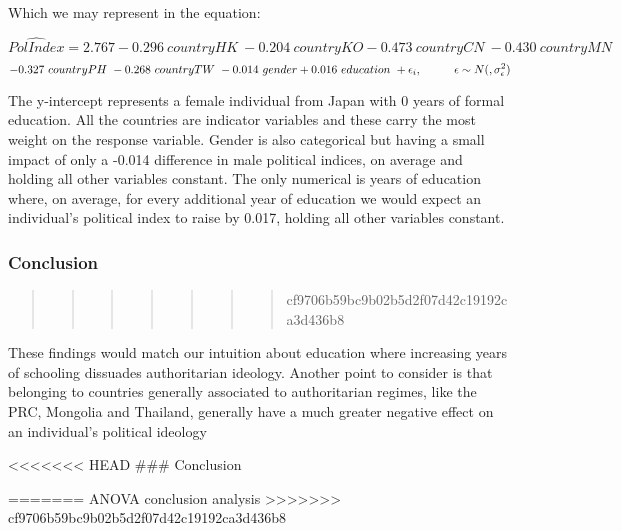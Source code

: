 \documentclass[
]{article}
\begin{document}
Which we may represent in the equation:

\[ \hat{PolIndex} = 2.767 - 0.296 ~ countryHK ~ - 0.204 ~ countryKO - 0.473 ~ countryCN ~ - 0.430 ~countryMN ~ \]
\[ - 0.327 ~ countryPH ~ - 0.268 ~ countryTW ~ - 0.014 ~ gender + 0.016 ~ education ~ + \epsilon_i, \hspace{10mm} \epsilon \sim N(, \sigma^2_{\epsilon})\]

The y-intercept represents a female individual from Japan with 0 years
of formal education. All the countries are indicator variables and these
carry the most weight on the response variable. Gender is also
categorical but having a small impact of only a -0.014 difference in
male political indices, on average and holding all other variables
constant. The only numerical is years of education where, on average,
for every additional year of education we would expect an individual's
political index to raise by 0.017, holding all other variables constant.

\hypertarget{conclusion}{%
\subsubsection{Conclusion}\label{conclusion}}

\begin{quote}
\begin{quote}
\begin{quote}
\begin{quote}
\begin{quote}
\begin{quote}
\begin{quote}
cf9706b59bc9b02b5d2f07d42c19192ca3d436b8
\end{quote}
\end{quote}
\end{quote}
\end{quote}
\end{quote}
\end{quote}
\end{quote}

These findings would match our intuition about education where
increasing years of schooling dissuades authoritarian ideology. Another
point to consider is that belonging to countries generally associated to
authoritarian regimes, like the PRC, Mongolia and Thailand, generally
have a much greater negative effect on an individual's political
ideology

\textless\textless\textless\textless\textless\textless\textless{} HEAD
\#\#\# Conclusion

======= ANOVA conclusion analysis
\textgreater\textgreater\textgreater\textgreater\textgreater\textgreater\textgreater{}
cf9706b59bc9b02b5d2f07d42c19192ca3d436b8
\end{document}
